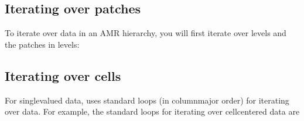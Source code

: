 \documentclass[letterpaper,10pt,english]{sphinxmanual}
\begin{document}
\subsection{Iterating over patches}
\label{\detokenize{Source/MeshData:iterating-over-patches}}
To iterate over data in an AMR hierarchy, you will first iterate over levels and the patches in levels:

\begin{sphinxVerbatim}[commandchars=\\\{\},formatcom=\scriptsize]
        
      \PYG{p}{[}\PYG{p}{]}

       

         
         \PYG{p}{[}\PYG{p}{]}
\end{sphinxVerbatim}


\subsection{Iterating over cells}
\label{\detokenize{Source/MeshData:iterating-over-cells}}
For single\sphinxhyphen{}valued data,  uses standard loops (in column\sphinxhyphen{}major order) for iterating over data.
For example, the standard loops for iterating over cell\sphinxhyphen{}centered data are
\end{document}
